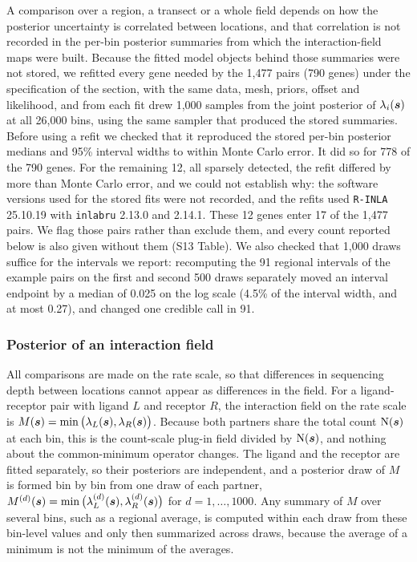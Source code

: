 \documentclass[10pt,letterpaper]{article}
\begin{document}
A comparison over a region, a transect or a whole field depends on how the posterior uncertainty is correlated between locations, and that correlation is not recorded in the per-bin posterior summaries from which the interaction-field maps were built. Because the fitted model objects behind those summaries were not stored, we refitted every gene needed by the 1,477 pairs (790 genes) under the specification of the  section, with the same data, mesh, priors, offset and likelihood, and from each fit drew 1,000 samples from the joint posterior of $\lambda_i(\mbox{\boldmath $s$})$ at all 26,000 bins, using the same sampler that produced the stored summaries. Before using a refit we checked that it reproduced the stored per-bin posterior medians and 95\% interval widths to within Monte Carlo error. It did so for 778 of the 790 genes. For the remaining 12, all sparsely detected, the refit differed by more than Monte Carlo error, and we could not establish why: the software versions used for the stored fits were not recorded, and the refits used \texttt{R-INLA} 25.10.19 with \texttt{inlabru} 2.13.0 and 2.14.1. These 12 genes enter 17 of the 1,477 pairs. We flag those pairs rather than exclude them, and every count reported below is also given without them (S13 Table). We also checked that 1,000 draws suffice for the intervals we report: recomputing the 91 regional intervals of the example pairs on the first and second 500 draws separately moved an interval endpoint by a median of 0.025 on the log scale (4.5\% of the interval width, and at most 0.27), and changed one credible call in 91.

\subsubsection*{Posterior of an interaction field}

All comparisons are made on the rate scale, so that differences in sequencing depth between locations cannot appear as differences in the field. For a ligand-receptor pair with ligand $L$ and receptor $R$, the interaction field on the rate scale is $M(\mbox{\boldmath $s$}) = \min\big(\lambda_L(\mbox{\boldmath $s$}), \lambda_R(\mbox{\boldmath $s$})\big)$. Because both partners share the total count $\mbox{N}(\mbox{\boldmath $s$})$ at each bin, this is the count-scale plug-in field divided by $\mbox{N}(\mbox{\boldmath $s$})$, and nothing about the common-minimum operator changes. The ligand and the receptor are fitted separately, so their posteriors are independent, and a posterior draw of $M$ is formed bin by bin from one draw of each partner, $M^{(d)}(\mbox{\boldmath $s$}) = \min\big(\lambda_L^{(d)}(\mbox{\boldmath $s$}), \lambda_R^{(d)}(\mbox{\boldmath $s$})\big)$ for $d = 1,\dots,1000$. Any summary of $M$ over several bins, such as a regional average, is computed within each draw from these bin-level values and only then summarized across draws, because the average of a minimum is not the minimum of the averages.
\end{document}
